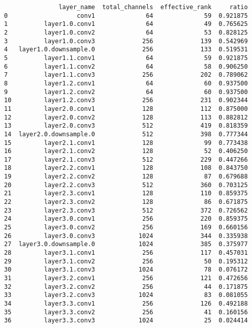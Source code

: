\documentclass[
  letterpaper,
  DIV=11,
  numbers=noendperiod]{scrreprt}
\begin{document}
\begin{verbatim}
               layer_name  total_channels  effective_rank     ratio
0                   conv1              64              59  0.921875
1          layer1.0.conv1              64              49  0.765625
2          layer1.0.conv2              64              53  0.828125
3          layer1.0.conv3             256             139  0.542969
4   layer1.0.downsample.0             256             133  0.519531
5          layer1.1.conv1              64              59  0.921875
6          layer1.1.conv2              64              58  0.906250
7          layer1.1.conv3             256             202  0.789062
8          layer1.2.conv1              64              60  0.937500
9          layer1.2.conv2              64              60  0.937500
10         layer1.2.conv3             256             231  0.902344
11         layer2.0.conv1             128             112  0.875000
12         layer2.0.conv2             128             113  0.882812
13         layer2.0.conv3             512             419  0.818359
14  layer2.0.downsample.0             512             398  0.777344
15         layer2.1.conv1             128              99  0.773438
16         layer2.1.conv2             128              52  0.406250
17         layer2.1.conv3             512             229  0.447266
18         layer2.2.conv1             128             108  0.843750
19         layer2.2.conv2             128              87  0.679688
20         layer2.2.conv3             512             360  0.703125
21         layer2.3.conv1             128             110  0.859375
22         layer2.3.conv2             128              86  0.671875
23         layer2.3.conv3             512             372  0.726562
24         layer3.0.conv1             256             220  0.859375
25         layer3.0.conv2             256             169  0.660156
26         layer3.0.conv3            1024             344  0.335938
27  layer3.0.downsample.0            1024             385  0.375977
28         layer3.1.conv1             256             117  0.457031
29         layer3.1.conv2             256              50  0.195312
30         layer3.1.conv3            1024              78  0.076172
31         layer3.2.conv1             256             121  0.472656
32         layer3.2.conv2             256              44  0.171875
33         layer3.2.conv3            1024              83  0.081055
34         layer3.3.conv1             256             126  0.492188
35         layer3.3.conv2             256              41  0.160156
36         layer3.3.conv3            1024              25  0.024414

\end{verbatim}
\end{document}
